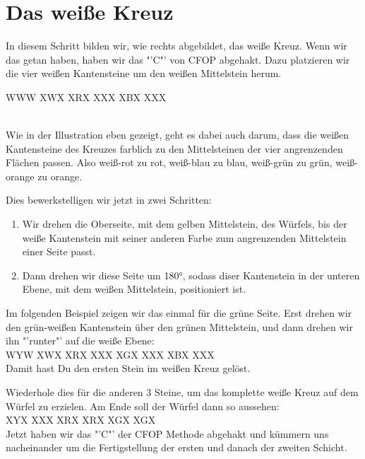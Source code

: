 \section{Das weiße Kreuz}
\parbox{0.7\linewidth}{
In diesem Schritt bilden wir, wie rechts abgebildet, das weiße Kreuz.
Wenn wir das getan haben, haben wir das "'C"' von CFOP abgehakt.
Dazu platzieren wir die vier weißen Kantensteine um den weißen Mittelstein herum.
}\parbox{0.3\linewidth}{
  \RubikCubeGreyAll%
	      {W}{W}{W}
	      {X}{W}{X}%
		 {X}{R}{X}
		 {X}{X}{X}%
		 {X}{B}{X}
		 {X}{X}{X}%
}\\[1em]

Wie in der Illustration eben gezeigt, geht es dabei auch darum, dass die weißen Kantensteine des Kreuzes farblich zu den Mittelsteinen der vier angrenzenden Flächen passen.
Also weiß-rot zu rot, weiß-blau zu blau, weiß-grün zu grün, weiß-orange zu orange.

Dies bewerkstelligen wir jetzt in zwei Schritten:
\begin{enumerate}
  \item Wir drehen die Oberseite, mit dem gelben Mittelstein, des Würfels, bis der weiße Kantenstein mit seiner anderen Farbe zum angrenzenden Mittelstein einer Seite passt.
  \item Dann drehen wir diese Seite um 180°, sodass diser Kantenstein in der unteren Ebene, mit dem weißen Mittelstein, positioniert ist.
\end{enumerate}
Im folgenden Beispiel zeigen wir das einmal für die grüne Seite. Erst drehen wir den grün-weißen Kantenstein über den grünen Mittelstein, und dann drehen wir ihn "'runter"' auf die weiße Ebene:\\[1em]

\RubikCubeGreyAll%
            {W}{Y}{W}
            {X}{W}{X}%
               {X}{R}{X}
	       {X}{X}{X}%
	       {X}{G}{X}
	       {X}{X}{X}%
	       {X}{B}{X}
	       {X}{X}{X}%
\quad{}
\quad{}
\quad{}
\\[1em]
Damit hast Du den ersten Stein im weißen Kreuz gelöst.
\pagebreak

Wiederhole dies für die anderen 3 Steine, um das komplette weiße Kreuz auf dem Würfel zu erzielen.
Am Ende soll der Würfel dann so aussehen:\\[1em]
\RubikCubeGreyAll%
            {X}{Y}{X}
            {X}{X}{X}%
               {X}{R}{X}
	       {X}{R}{X}%
	       {X}{G}{X}
	       {X}{G}{X}%
\\[1em]

Jetzt haben wir das "'C"' der CFOP Methode abgehakt und kümmern uns nacheinander um die
Fertigstellung der ersten und danach der zweiten Schicht.
